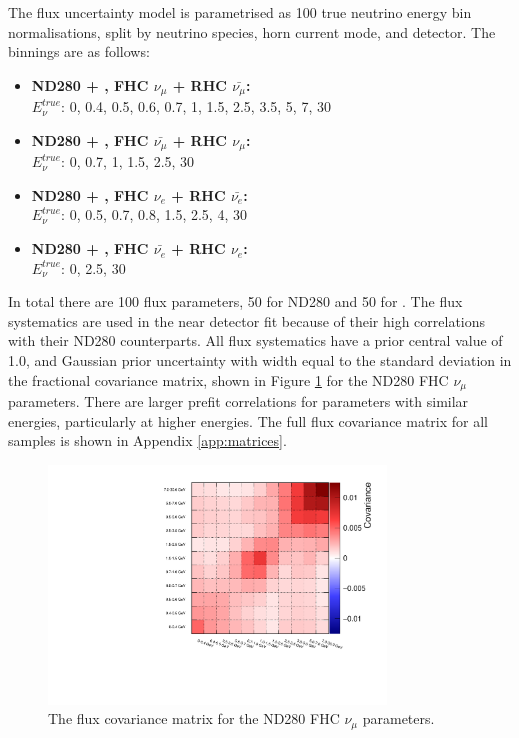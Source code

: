 The flux uncertainty model is parametrised as 100 true neutrino energy bin normalisations, split by neutrino species, horn current mode, and detector. The binnings are as follows:

\begin{itemize}

\item \textbf{ND280 + \SK, FHC $\nu_\mu$ + RHC $\bar{\nu_\mu}$:}\\
$E^{true}_{\nu}$: 0, 0.4, 0.5, 0.6, 0.7, 1, 1.5, 2.5, 3.5, 5, 7, 30

\item \textbf{ND280 + \SK, FHC $\bar{\nu_\mu}$ + RHC $\nu_\mu$:}\\
$E^{true}_{\nu}$: 0, 0.7, 1, 1.5, 2.5, 30

\item \textbf{ND280 + \SK, FHC $\nu_e$ + RHC $\bar{\nu_e}$:}\\
$E^{true}_{\nu}$: 0, 0.5, 0.7, 0.8, 1.5, 2.5, 4, 30

\item \textbf{ND280 + \SK, FHC $\bar{\nu_e}$ + RHC $\nu_e$:}\\
$E^{true}_{\nu}$: 0, 2.5, 30

\end{itemize}

In total there are 100 flux parameters, 50 for ND280 and 50 for \SK. The \SK flux systematics are used in the near detector fit because of their high correlations with their ND280 counterparts. All flux systematics have a prior central value of 1.0, and Gaussian prior uncertainty with width equal to the standard deviation in the fractional covariance matrix, shown in Figure \ref{fig:fluxcov1sample} for the ND280 FHC $\nu_\mu$ parameters. There are larger prefit correlations for parameters with similar energies, particularly at higher energies. The full flux covariance matrix for all samples is shown in Appendix \ref{app:matrices}.

\begin{figure}
\centering
\includegraphics*[width=0.8\textwidth,clip]{figs/fluxcov1sample}
\caption{The flux covariance matrix for the ND280 FHC $\nu_\mu$ parameters.}\label{fig:fluxcov1sample}
\end{figure}

